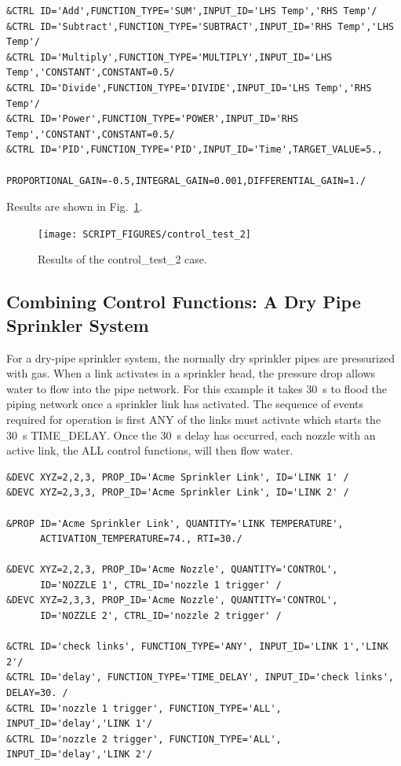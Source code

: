 \documentclass[11pt]{book}
\begin{document}
\begin{lstlisting}
&CTRL ID='Add',FUNCTION_TYPE='SUM',INPUT_ID='LHS Temp','RHS Temp'/
&CTRL ID='Subtract',FUNCTION_TYPE='SUBTRACT',INPUT_ID='RHS Temp','LHS Temp'/
&CTRL ID='Multiply',FUNCTION_TYPE='MULTIPLY',INPUT_ID='LHS Temp','CONSTANT',CONSTANT=0.5/
&CTRL ID='Divide',FUNCTION_TYPE='DIVIDE',INPUT_ID='LHS Temp','RHS Temp'/
&CTRL ID='Power',FUNCTION_TYPE='POWER',INPUT_ID='RHS Temp','CONSTANT',CONSTANT=0.5/
&CTRL ID='PID',FUNCTION_TYPE='PID',INPUT_ID='Time',TARGET_VALUE=5.,
          PROPORTIONAL_GAIN=-0.5,INTEGRAL_GAIN=0.001,DIFFERENTIAL_GAIN=1./
\end{lstlisting}

\noindent Results are shown in Fig.~\ref{control_test_2_fig}.
\begin{figure}[ht]
\centering
\texttt{[image: SCRIPT\_FIGURES/control\_test\_2]}
\caption[Results of the {\ct control\_test\_2} case]{Results of the {\ct control\_test\_2} case.}
\label{control_test_2_fig}
\end{figure}


\subsection{Combining Control Functions: A Dry Pipe Sprinkler System}
\label{info:dry_pipe}

For a dry-pipe sprinkler system, the normally
dry sprinkler pipes are pressurized with gas.  When a link activates in a sprinkler head, the pressure drop allows
water to flow into the pipe network.  For this example it takes 30~s to flood the piping network once a sprinkler link
has activated.  The sequence of events required for operation is first {\ct ANY} of the links must activate which
starts the 30~s {\ct TIME\_DELAY}.  Once the 30~s delay has occurred, each nozzle with an active link, the {\ct ALL}
control functions, will then flow water.

\begin{lstlisting}
&DEVC XYZ=2,2,3, PROP_ID='Acme Sprinkler Link', ID='LINK 1' /
&DEVC XYZ=2,3,3, PROP_ID='Acme Sprinkler Link', ID='LINK 2' /

&PROP ID='Acme Sprinkler Link', QUANTITY='LINK TEMPERATURE',
      ACTIVATION_TEMPERATURE=74., RTI=30./

&DEVC XYZ=2,2,3, PROP_ID='Acme Nozzle', QUANTITY='CONTROL',
      ID='NOZZLE 1', CTRL_ID='nozzle 1 trigger' /
&DEVC XYZ=2,3,3, PROP_ID='Acme Nozzle', QUANTITY='CONTROL',
      ID='NOZZLE 2', CTRL_ID='nozzle 2 trigger' /

&CTRL ID='check links', FUNCTION_TYPE='ANY', INPUT_ID='LINK 1','LINK 2'/
&CTRL ID='delay', FUNCTION_TYPE='TIME_DELAY', INPUT_ID='check links', DELAY=30. /
&CTRL ID='nozzle 1 trigger', FUNCTION_TYPE='ALL', INPUT_ID='delay','LINK 1'/
&CTRL ID='nozzle 2 trigger', FUNCTION_TYPE='ALL', INPUT_ID='delay','LINK 2'/
\end{lstlisting}
\end{document}
